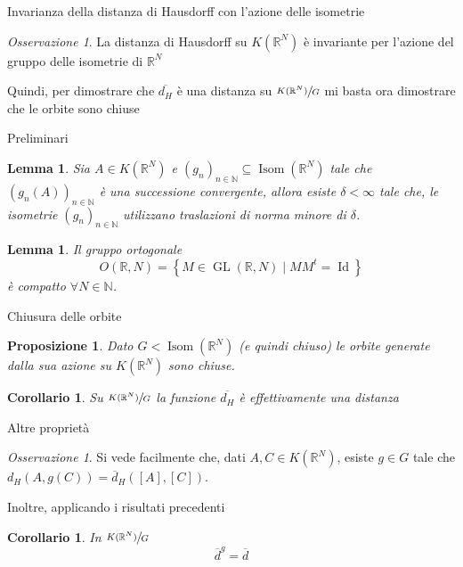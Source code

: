 \documentclass{beamer}
\newcounter{counter1}
\theoremstyle{plain}
\newtheorem{mylem}[counter1]{Lemma}
\newtheorem{mypro}[counter1]{Proposizione}
\newtheorem{mycor}[counter1]{Corollario}
\theoremstyle{definition}
\theoremstyle{remark}
\newtheorem{myoss}[counter1]{Osservazione}
\newcommand{\obar}[1]{\overline{#1}}
\newcommand{\set}[1]{\left\{#1\right\}}
\newcommand{\pa}[1]{\left(#1\right)}
\newcommand{\bra}[1]{\left[#1\right]}
\DeclareMathOperator{\id}{Id}
\DeclareMathOperator{\gl}{GL}
\DeclareMathOperator{\isom}{Isom}
\begin{document}
\begin{frame}{Invarianza della distanza di Hausdorff con l'azione
    delle isometrie}
  \begin{myoss}
    La distanza di Hausdorff su $K(\mathbb{R}^N)$ è invariante per
    l'azione del gruppo delle isometrie di $\mathbb{R}^N$
  \end{myoss}

  Quindi, per dimostrare che $\obar{ d _H }$ è una distanza su
  $\sfrac{K(\mathbb{R}^N)}{G}$ mi basta ora dimostrare che le orbite
  sono chiuse
\end{frame}

\begin{frame}{Preliminari}
  \begin{mylem}
    Sia $A \in K(\mathbb{R}^N)$ e $\pa{ g_n} _{n \in \mathbb{N}}
    \subseteq \isom( \mathbb{R}^N)$ tale che $\pa{ g_n(A) } _{n \in
      \mathbb{N}}$ è una successione convergente, allora esiste $\delta
    < \infty$ tale che, le isometrie $\pa{ g_n} _{n\in \mathbb{N}}$
    utilizzano traslazioni di norma minore di $\delta$.
  \end{mylem}
  \begin{mylem}
    Il gruppo ortogonale 
    \[ O(\mathbb{R},N) = \set{ M \in \gl (\mathbb{R},N) \mid M M^t =
      \id } \]
    è compatto $\forall N \in \mathbb{N}$.
  \end{mylem}
\end{frame}

\begin{frame}{Chiusura delle orbite}
  \begin{mypro}
    Dato $G < \isom(\mathbb{R}^N)$ (e quindi chiuso) le orbite
    generate dalla sua azione su $K(\mathbb{R}^N)$ sono chiuse.
  \end{mypro}
  \begin{mycor}
    Su $\sfrac{K(\mathbb{R}^N)}{G}$ la funzione $\obar{ d _H }$ è
    effettivamente una distanza
  \end{mycor}
\end{frame}

\begin{frame}{Altre proprietà}
  \begin{myoss}
    Si vede facilmente che, dati $A,C \in K(\mathbb{R}^N)$, esiste $g
    \in G$ tale che $d_H \pa{A, g(C)} = \obar d _H \pa{ \bra{A},
      \bra{C}}$.
  \end{myoss}
  Inoltre, applicando i risultati precedenti
  \begin{mycor}
    In $\sfrac{K(\mathbb{R}^N)}{G}$ 
    \[ \obar{d} ^g = \obar{d} \]
  \end{mycor}
\end{frame}
\end{document}
